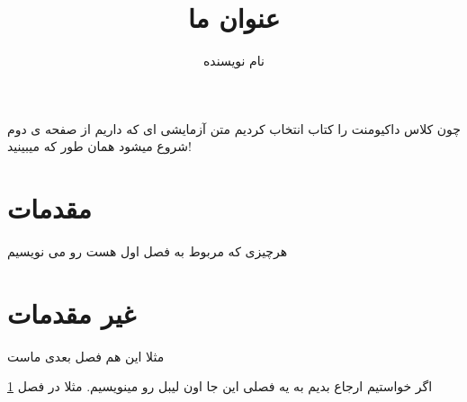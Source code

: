 \documentclass{book}
\title{عنوان ما}
\author{نام نویسنده}
\begin{document}
\maketitle		

چون کلاس داکیومنت را کتاب انتخاب کردیم متن آزمایشی ای که داریم از صفحه ی دوم شروع میشود همان طور که میبینید!

\chapter{مقدمات}\label{chap1}
هرچیزی که مربوط به فصل اول هست رو می نویسیم

\chapter{غیر مقدمات}
مثلا این هم فصل بعدی ماست

اگر خواستیم ارجاع بدیم به یه فصلی این جا اون لیبل رو مینویسیم. مثلا در فصل \ref{chap1}
\end{document}
